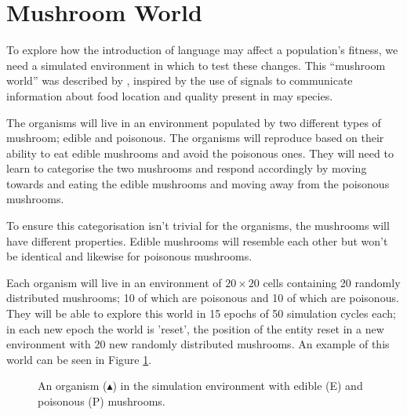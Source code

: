 \documentclass[12pt,a4paper,twoside,openright]{report}
\begin{document}
\section{Mushroom World}\label{section:world}

To explore how the introduction of language may affect a population's fitness, we need a simulated environment in which to test these changes. This ``mushroom world'' was described by \cite{Cangelosi1998}, inspired by the use of signals to communicate information about food location and quality present in may species.

The organisms will live in an environment populated by two different types of mushroom; edible and poisonous. The organisms will reproduce based on their ability to eat edible mushrooms and avoid the poisonous ones. They will need to learn to categorise the two mushrooms and respond accordingly by moving towards and eating the edible mushrooms and moving away from the poisonous mushrooms.

To ensure this categorisation isn't trivial for the organisms, the mushrooms will have different properties. Edible mushrooms will resemble each other but won't be identical and likewise for poisonous mushrooms.

Each organism will live in an environment of $20 \times 20$ cells containing 20 randomly distributed mushrooms; 10 of which are poisonous and 10 of which are poisonous. They will be able to explore this world in 15 epochs of 50 simulation cycles each; in each new epoch the world is 'reset', the position of the entity reset in a new environment with 20 new randomly distributed mushrooms. An example of this world can be seen in Figure \ref{fig:environment}.

\begin{figure}[h]
\centering
{}
\caption{An organism ($\blacktriangle$) in the simulation environment with edible (E) and poisonous (P) mushrooms.}
\label{fig:environment}
\end{figure}
\end{document}
